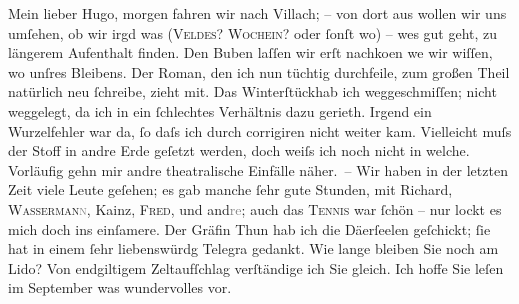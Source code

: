 \pstart{}Mein lieber Hugo, \pend\vspace{0.5em}
\pstart
           morgen fahren wir nach Villach; – von dort aus
               wollen wir uns umſehen, ob wir irgd was (\textsc{Veldes? Wochein}? oder ſonſt wo) – we{\geminationn}s gut geht, zu längerem
               Aufenthalt finden. Den Buben
               laſſen wir erſt nachko{\geminationm}en we{\geminationn} wir wiſſen, wo unſres Bleibens. Der Roman, den ich nun tüchtig durchfeile, zum großen Theil
               natürlich neu ſchreibe, zieht mit. Das Winterſtückhab ich weggeschmiſſen; nicht weggelegt, da ich in ein
               ſchlechtes Verhältnis dazu gerieth. Irgend ein Wurzelfehler war da, ſo daſs ich durch
               corrigiren nicht weiter kam. Vielleicht muſs der Stoff in andre Erde geſetzt werden,
               doch weiſs ich noch nicht in welche. Vorläufig gehn mir andre theatralische Einfälle
               näher. – Wir haben in der letzten Zeit viele Leute geſehen; es gab manche ſehr gute
               Stunden, mit Richard, \textsc{Wasserman\textcolor{gray}{n}}, Kainz, \introOben{}\textsc{Fred}, und and\textcolor{gray}{re}\introOben{}; auch das \textsc{Tennis} war ſchön – nur lockt es mich {\pb}doch ins einſamere. Der Gräfin Thun hab ich die Dä{\geminationm}erſeelen geſchickt; ſie hat in einem ſehr
               liebenswürdg Telegra{\geminationm} gedankt. Wie lange bleiben Sie
               noch am Lido? Von endgiltigem Zeltaufſchlag
               verſtändige ich Sie gleich. Ich hoffe Sie leſen im September was
               wundervolles vor.\pend
           
